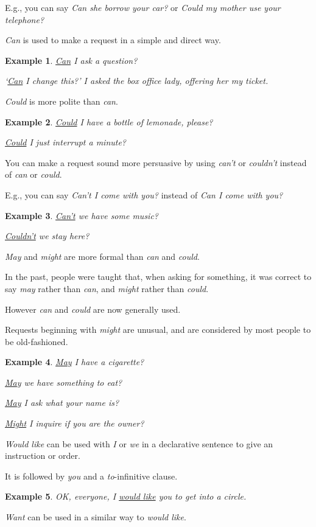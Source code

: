 \documentclass[oneside]{book}
\numberwithin{equation}{section}
\newtheorem{example}{Example}[section]
\begin{document}
E.g., you can say \textit{Can she borrow your car?} or \textit{Could my mother use your telephone?}

%
\noindent{} \textit{Can} is used to make a request in a simple and direct way.
\begin{example}
    \underline{Can} I ask a question?
    
    `\underline{Can} I change this?' I asked the box office lady, offering her my ticket.
\end{example}
%
\noindent{} \textit{Could} is more polite than \textit{can}.
\begin{example}
    \underline{Could} I have a bottle of lemonade, please?
    
    \underline{Could} I just interrupt a minute?
\end{example}
%
\noindent{} You can make a request sound more persuasive by using \textit{can't} or \textit{couldn't} instead of \textit{can} or \textit{could}.

E.g., you can say \textit{Can't I come with you?} instead of \textit{Can I come with you?}
\begin{example}
    \underline{Can't} we have some music?
    
    \underline{Couldn't} we stay here?
\end{example}
%
\noindent{} \textit{May} and \textit{might} are more formal than \textit{can} and \textit{could}.

In the past, people were taught that, when asking for something, it was correct to say \textit{may} rather than \textit{can}, and \textit{might} rather than \textit{could}.

However \textit{can} and \textit{could} are now generally used.

Requests beginning with \textit{might} are unusual, and are considered by most people to be old-fashioned.
\begin{example}
    \underline{May} I have a cigarette?
    
    \underline{May} we have something to eat?
    
    \underline{May} I ask what your name is?
    
    \underline{Might} I inquire if you are the owner?
\end{example}
%
\noindent{} \textit{Would like} can be used with \textit{I} or \textit{we} in a declarative sentence to give an instruction or order.

It is followed by \textit{you} and a \textit{to}-infinitive clause.
\begin{example}
    OK, everyone, I \underline{would like} you to get into a circle.
\end{example}
\textit{Want} can be used in a similar way to \textit{would like}.
\end{document}
